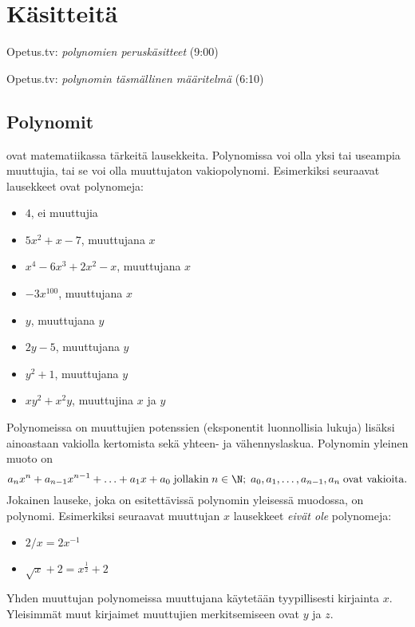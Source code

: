 \section{Käsitteitä}

{Opetus.tv: \emph{polynomien peruskäsitteet} (9:00)}

{Opetus.tv: \emph{polynomin täsmällinen määritelmä} (6:10)}

\subsection*{Polynomit}

 ovat matematiikassa tärkeitä lausekkeita.
Polynomissa voi olla yksi tai useampia muuttujia, tai se voi olla muuttujaton vakiopolynomi.
Esimerkiksi seuraavat lausekkeet ovat polynomeja:
\begin{itemize}
\item $4$, ei muuttujia
\item $5x^2+x-7$, muuttujana $x$
\item $x^4-6x^3+2x^2-x$, muuttujana $x$
\item $-3x^{100}$, muuttujana $x$
\item $y$, muuttujana $y$
\item $2y-5$, muuttujana $y$
\item $y^2+1$, muuttujana $y$
\item $xy^2+x^2y$, muuttujina $x$ ja $y$
\end{itemize}
Polynomeissa on muuttujien potenssien (eksponentit luonnollisia lukuja) lisäksi ainoastaan vakiolla kertomista sekä yhteen- ja vähennyslaskua.
Polynomin yleinen muoto on
\[
a_n x^n + a_{n-1} x^{n-1} + \ldots + a_1 x + a_0 \; \textnormal{jollakin} \; n\in\N; \; a_0, a_1, \ldots, a_{n-1}, a_n \; \textnormal{ovat vakioita}.
\] %
Jokainen lauseke, joka on esitettävissä polynomin yleisessä muodossa, on polynomi.
Esimerkiksi seuraavat muuttujan $x$ lausekkeet \emph{eivät ole} polynomeja:
\begin{itemize}
\item $2/x = 2x^{-1}$
\item $\sqrt{x}+2 = x^{\frac{1}{2}}+2$
\end{itemize}
Yhden muuttujan polynomeissa muuttujana käytetään tyypillisesti kirjainta $x$.
Yleisimmät muut kirjaimet muuttujien merkitsemiseen ovat $y$ ja $z$.

